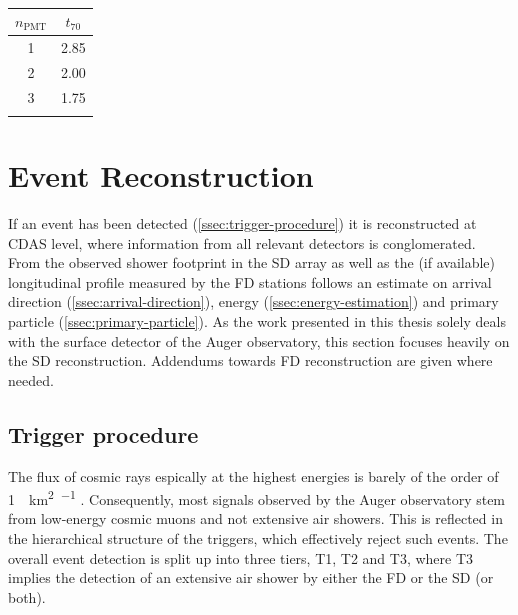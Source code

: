 \begin{table}[h]
	\begin{center}
	\caption{}
	\begin{tabular*}{0.2\textwidth}{@{\extracolsep{\fill}} cc}
		\toprule
		$n_\text{PMT}$ & $t_{70}$ \\
		\midrule
		1 & 2.85 \\
		2 & 2.00 \\
		3 & 1.75 \\
		\bottomrule
	\label{tab:calib-trigger-thresholds}
	\end{tabular*}
	\end{center}
\end{table}

\section{Event Reconstruction}
\label{sec:event-reconstruction}

If an event has been detected (\autoref{ssec:trigger-procedure}) it is reconstructed at CDAS level, where information from all relevant detectors is conglomerated.
From the observed shower footprint in the SD array as well as the (if available) longitudinal profile measured by the FD stations follows an estimate on arrival 
direction (\autoref{ssec:arrival-direction}), energy (\autoref{ssec:energy-estimation}) and primary particle (\autoref{ssec:primary-particle}). As the work 
presented in this thesis solely deals with the surface detector of the Auger observatory, this section focuses heavily on the SD reconstruction. Addendums towards
FD reconstruction are given where needed.

\subsection{Trigger procedure}
\label{ssec:trigger-procedure}

The flux of cosmic rays espically at the highest energies is barely of the order of \SI[per-mode=reciprocal]{1}{\per\kilo\meter\squared\per\year} 
\cite{hillas1984origin}. Consequently, most signals observed by the Auger observatory stem from low-energy cosmic muons and not extensive air showers. This is 
reflected in the hierarchical structure of the triggers, which effectively reject such events. The overall event detection is split up into three tiers, T1, T2 and
T3, where T3 implies the detection of an extensive air shower by either the FD or the SD (or both).


